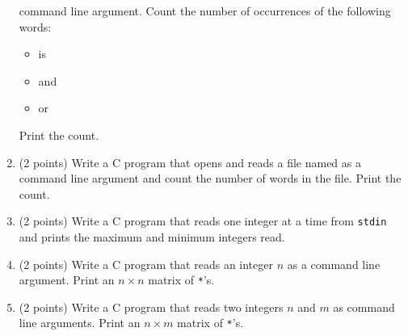 \documentclass[12pt]{article}
\begin{document}
\begin{enumerate}
    command line argument. Count the number of occurrences of the following
    words:
    \begin{itemize}
      \item is
      \item and
      \item or
    \end{itemize}
    Print the count.
  \item (2 points) Write a C program that opens and reads a file named as a command line
    argument and count the number of words in the file. Print the count.
  \item (2 points) Write a C program that reads one integer at a time from
    \texttt{stdin} and prints the maximum and minimum integers read.
  \item (2 points) Write a C program that reads an integer $n$ as a command
    line argument. Print an $n \times n$ matrix of \texttt{*}'s.
  \item (2 points) Write a C program that reads two integers $n$ and $m$ as command
    line arguments. Print an $n \times m$ matrix of \texttt{*}'s.
\end{enumerate}
\end{document}
